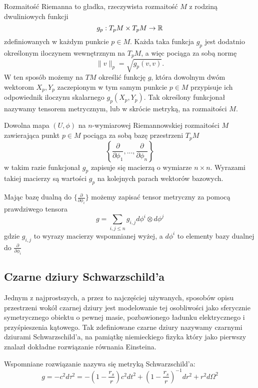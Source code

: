 Rozmaitość Riemanna to gładka, rzeczywista rozmaitość $M$ z rodziną dwuliniowych funkcji 
$$g_p:T_pM\times T_pM\to \operatorname{\mathbb{R}}$$ 
zdefiniowanych w każdym punkcie $p\in M$. Każda taka funkcja $g_p$ jest dodatnio określonym iloczynem wewnętrznym na $T_pM$, a więc pociąga za sobą normę 
$$\|v\|_p=\sqrt{g_p(v, v)}.$$
W ten sposób możemy na $TM$ określić funkcję $g$, która dowolnym dwóm wektorom $X_p,Y_p$ zaczepionym w tym samym punkcie $p\in M$ przypisuje ich odpowiednik iloczynu skalarnego $g_p(X_p,Y_p)$. Tak określony funkcjonał nazywamy tensorem metrycznym, lub w skrócie metryką, na rozmaitości $M$.

Dowolna mapa $(U,\phi)$ na $n$-wymiarowej Riemannowskiej rozmaitości $M$ zawierająca punkt $p\in M$ pociąga za sobą bazę przestrzeni $T_pM$
$$\left\{ \frac{\partial}{\partial\phi_1} , ... , \frac{\partial}{\partial\phi_n} \right\}$$
w takim razie funkcjonał $g_p$ zapisuje się macierzą o wymiarze $n\times n$. Wyrazami takiej macierzy są wartości $g_p$ na kolejnych parach wektorów bazowych.

Mając bazę dualną do $\{\frac{\partial}{\partial\phi_i}\}$ możemy zapisać tensor metryczny za pomocą prawdziwego tensora
$$g=\sum_{i,j\leq n}g_{i,j}d\phi^i\otimes d\phi^j$$
gdzie $g_{i,j}$ to wyrazy macierzy wspomnianej wyżej, a $d\phi^i$ to elementy bazy dualnej do $\frac{\partial}{\partial\phi_i}$


\subsection{Czarne dziury Schwarzschild'a}

Jednym z najprostszych, a przez to najczęściej używanych, sposobów opisu przestrzeni wokół czarnej dziury jest modelowanie tej osobliwości jako sferycznie symetrycznego obiektu o pewnej masie, pozbawionego ładunku elektrycznego i przyśpieszenia kątowego. Tak zdefiniowane czarne dziury nazywamy czarnymi dziurami Schwarzschild'a, na pamiątkę niemieckiego fizyka który jako pierwszy znalazł dokładne rozwiązanie równania Einsteina.

Wspomniane rozwiązanie nazywa się metryką Schwarzschild'a:
$$g=-c^2d\tau^2=- \left( 1-\frac{r_s}{r}  \right) c^2dt^2 + \left(1-\frac{r_s}{r} \right)^{-1}dr^2 +r^2d\Omega^2 $$
